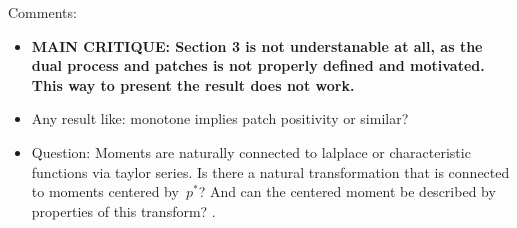 \documentclass[EJP,preprint,NODS,nobera]{ejpecp}
\begin{document}
Comments:
\begin{itemize}
    \item {\bf MAIN CRITIQUE: Section 3 is not understanable at all, as the dual process and patches is not properly defined and motivated. This way to present the result does not work.}
    \item Any result like: monotone implies patch positivity or similar?
    \item Question: Moments are naturally connected to lalplace or characteristic functions via taylor series. Is there a natural transformation that is connected to moments centered by~$p^*$? And can the centered moment be described by properties of this transform?
.\end{itemize}


\clearpage
\tableofcontents
\clearpage
























\appendix









\end{document}
